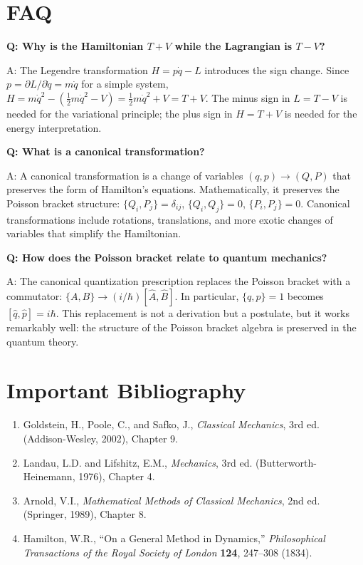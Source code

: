 \section*{FAQ}

\textbf{Q: Why is the Hamiltonian $T + V$ while the Lagrangian is $T - V$?}

A: The Legendre transformation $H = p\dot{q} - L$ introduces the sign change. Since $p = \partial L/\partial\dot{q} = m\dot{q}$ for a simple system, $H = m\dot{q}^2 - (\frac{1}{2}m\dot{q}^2 - V) = \frac{1}{2}m\dot{q}^2 + V = T + V$. The minus sign in $L = T - V$ is needed for the variational principle; the plus sign in $H = T + V$ is needed for the energy interpretation.

\textbf{Q: What is a canonical transformation?}

A: A canonical transformation is a change of variables $(q, p) \to (Q, P)$ that preserves the form of Hamilton's equations. Mathematically, it preserves the Poisson bracket structure: $\{Q_i, P_j\} = \delta_{ij}$, $\{Q_i, Q_j\} = 0$, $\{P_i, P_j\} = 0$. Canonical transformations include rotations, translations, and more exotic changes of variables that simplify the Hamiltonian.

\textbf{Q: How does the Poisson bracket relate to quantum mechanics?}

A: The canonical quantization prescription replaces the Poisson bracket with a commutator: $\{A, B\} \to (i/\hbar)[\hat{A}, \hat{B}]$. In particular, $\{q, p\} = 1$ becomes $[\hat{q}, \hat{p}] = i\hbar$. This replacement is not a derivation but a postulate, but it works remarkably well: the structure of the Poisson bracket algebra is preserved in the quantum theory.
\section*{Important Bibliography}

\begin{enumerate}
\item Goldstein, H., Poole, C., and Safko, J., \textit{Classical Mechanics}, 3rd ed. (Addison-Wesley, 2002), Chapter 9.
\item Landau, L.D. and Lifshitz, E.M., \textit{Mechanics}, 3rd ed. (Butterworth-Heinemann, 1976), Chapter 4.
\item Arnold, V.I., \textit{Mathematical Methods of Classical Mechanics}, 2nd ed. (Springer, 1989), Chapter 8.
\item Hamilton, W.R., ``On a General Method in Dynamics,'' \textit{Philosophical Transactions of the Royal Society of London} \textbf{124}, 247--308 (1834).
\end{enumerate}

